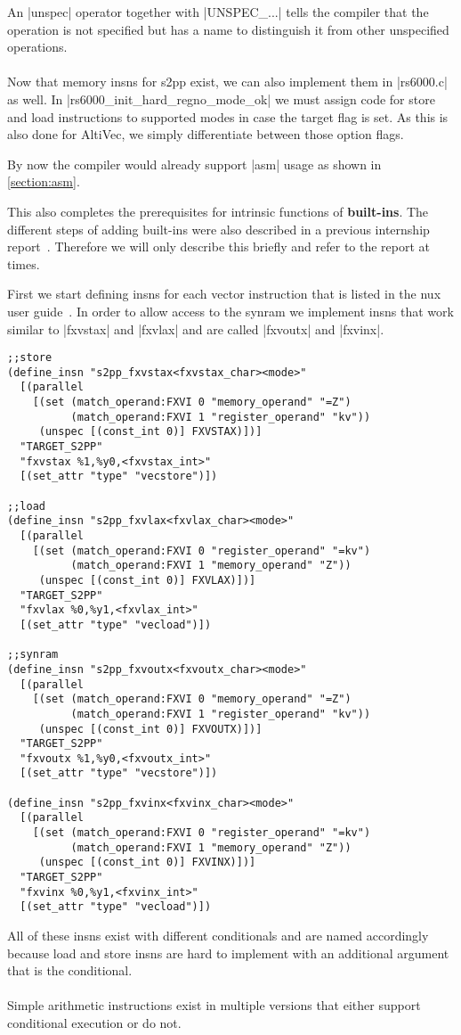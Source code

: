 An |unspec| operator together with |UNSPEC_...| tells the compiler that the operation is not specified but has a name to distinguish it from other unspecified operations.
\\
\\
Now that memory insns for s2pp exist, we can also implement them in |rs6000.c| as well.
In |rs6000_init_hard_regno_mode_ok| we must assign code for store and load instructions to supported modes in case the target flag is set.
As this is also done for AltiVec, we simply differentiate between those option flags.

By now the compiler would already support |asm| usage as shown in \ref{section:asm}.

This also completes the prerequisites for intrinsic functions of \textbf{built-ins}.
The different steps of adding built-ins were also described in a previous internship report~\citep{heimbrecht_2017internship}.
Therefore we will only describe this briefly and refer to the report at times.

First we start defining insns for each vector instruction that is listed in the nux user guide~\citep{nuxmanual}.
In order to allow access to the synram we implement insns that work similar to |fxvstax| and |fxvlax| and are called |fxvoutx| and |fxvinx|.
\begin{lstlisting}
;;store
(define_insn "s2pp_fxvstax<fxvstax_char><mode>"
  [(parallel
    [(set (match_operand:FXVI 0 "memory_operand" "=Z")
          (match_operand:FXVI 1 "register_operand" "kv"))
     (unspec [(const_int 0)] FXVSTAX)])]
  "TARGET_S2PP"
  "fxvstax %1,%y0,<fxvstax_int>"
  [(set_attr "type" "vecstore")])

;;load
(define_insn "s2pp_fxvlax<fxvlax_char><mode>"
  [(parallel
    [(set (match_operand:FXVI 0 "register_operand" "=kv")
          (match_operand:FXVI 1 "memory_operand" "Z"))
     (unspec [(const_int 0)] FXVLAX)])]
  "TARGET_S2PP"
  "fxvlax %0,%y1,<fxvlax_int>"
  [(set_attr "type" "vecload")])

;;synram
(define_insn "s2pp_fxvoutx<fxvoutx_char><mode>"
  [(parallel
    [(set (match_operand:FXVI 0 "memory_operand" "=Z")
          (match_operand:FXVI 1 "register_operand" "kv"))
     (unspec [(const_int 0)] FXVOUTX)])]
  "TARGET_S2PP"
  "fxvoutx %1,%y0,<fxvoutx_int>"
  [(set_attr "type" "vecstore")])

(define_insn "s2pp_fxvinx<fxvinx_char><mode>"
  [(parallel
    [(set (match_operand:FXVI 0 "register_operand" "=kv")
          (match_operand:FXVI 1 "memory_operand" "Z"))
     (unspec [(const_int 0)] FXVINX)])]
  "TARGET_S2PP"
  "fxvinx %0,%y1,<fxvinx_int>"
  [(set_attr "type" "vecload")])
\end{lstlisting}
All of these insns exist with different conditionals and are named accordingly because load and store insns are hard to implement with an additional argument that is the conditional.
\\
\\
Simple arithmetic instructions exist in multiple versions that either support conditional execution or do not.

